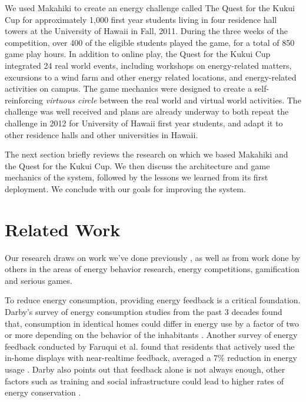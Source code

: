 \documentclass{acm_proc_article-sp}
\begin{document}
We used Makahiki to create an energy challenge called The Quest for the
Kukui Cup for approximately 1,000 first year students living in four residence hall towers at the University of Hawaii in Fall, 2011. During the
three weeks of the competition, over 400 of the eligible students played
the game, for a total of 850 game play hours.  In addition to online play,
the Quest for the Kukui Cup integrated 24 real world events, including
workshops on energy-related matters, excursions to a wind farm and other
energy related locations, and energy-related activities on campus. The game
mechanics were designed to create a self-reinforcing \emph{virtuous circle}
between the real world and virtual world activities.  The challenge was
well received and plans are already underway to both repeat
the challenge in 2012 for University of Hawaii first year students, and 
adapt it to other residence halls and other universities in Hawaii.

The next section briefly reviews the research on which we based Makahiki
and the Quest for the Kukui Cup.   We then discuss the architecture and
game mechanics of the system, followed by the lessons we learned from its
first deployment. We conclude with our goals for improving
the system.

\section{Related Work}
Our research draws on work we've done previously
 \cite{csdl2-11-03,csdl2-10-07,csdl2-11-02}, as well as from
work done by others in the areas of energy behavior research, energy 
competitions, gamification and serious games. 

To reduce energy consumption, providing energy feedback is a critical 
foundation. Darby's survey of energy consumption studies from the past 3 
decades found  that, consumption in identical homes could differ in energy use 
by a factor of two or more depending on the behavior of the inhabitants
 \cite{darby-review-2006}. Another survey of energy feedback conducted by 
Faruqui et al. found that residents that actively used the in-home displays 
with near-realtime feedback, averaged a 7\% reduction in energy usage
 \cite{Faruqui09}. Darby also points out that feedback alone is not always 
enough, other factors such as training and social infrastructure could lead to 
higher rates of energy conservation \cite{darby-2000-making-it-obvious}.
\end{document}
